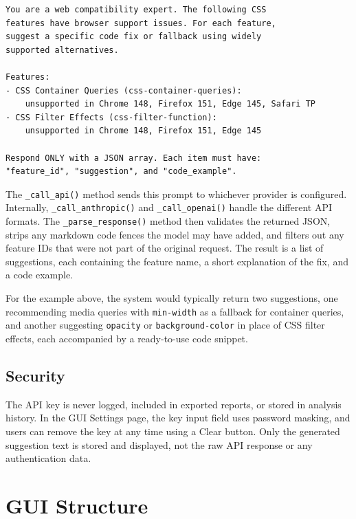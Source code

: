\begin{lstlisting}[caption={Example AI fix-suggestion prompt}, label=src:ai-prompt, basicstyle=\ttfamily\small, breaklines=true]
You are a web compatibility expert. The following CSS
features have browser support issues. For each feature,
suggest a specific code fix or fallback using widely
supported alternatives.

Features:
- CSS Container Queries (css-container-queries):
    unsupported in Chrome 148, Firefox 151, Edge 145, Safari TP
- CSS Filter Effects (css-filter-function):
    unsupported in Chrome 148, Firefox 151, Edge 145

Respond ONLY with a JSON array. Each item must have:
"feature_id", "suggestion", and "code_example".
\end{lstlisting}

The \texttt{\_call\_api()} method sends this prompt to whichever provider is configured. Internally, \texttt{\_call\_anthropic()} and \texttt{\_call\_openai()} handle the different API formats. The \texttt{\_parse\_response()} method then validates the returned JSON, strips any markdown code fences the model may have added, and filters out any feature IDs that were not part of the original request. The result is a list of suggestions, each containing the feature name, a short explanation of the fix, and a code example.

For the example above, the system would typically return two suggestions, one recommending media queries with \texttt{min-width} as a fallback for container queries, and another suggesting \texttt{opacity} or \texttt{background-color} in place of CSS filter effects, each accompanied by a ready-to-use code snippet.

\subsection{Security}

The API key is never logged, included in exported reports, or stored in analysis history. In the GUI Settings page, the key input field uses password masking, and users can remove the key at any time using a Clear button. Only the generated suggestion text is stored and displayed, not the raw API response or any authentication data.

\section{GUI Structure}
\label{sec:gui}

